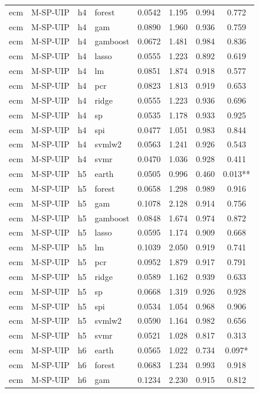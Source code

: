 \begin{ThreePartTable}
\begin{longtable}[t]{llclcccc}
ecm & M-SP-UIP & h4 & forest & 0.0542 & 1.195 & 0.994 & 0.772\\
ecm & M-SP-UIP & h4 & gam & 0.0890 & 1.960 & 0.936 & 0.759\\
ecm & M-SP-UIP & h4 & gamboost & 0.0672 & 1.481 & 0.984 & 0.836\\
ecm & M-SP-UIP & h4 & lasso & 0.0555 & 1.223 & 0.892 & 0.619\\
ecm & M-SP-UIP & h4 & lm & 0.0851 & 1.874 & 0.918 & 0.577\\
ecm & M-SP-UIP & h4 & pcr & 0.0823 & 1.813 & 0.919 & 0.653\\
ecm & M-SP-UIP & h4 & ridge & 0.0555 & 1.223 & 0.936 & 0.696\\
ecm & M-SP-UIP & h4 & sp & 0.0535 & 1.178 & 0.933 & 0.925\\
ecm & M-SP-UIP & h4 & spi & 0.0477 & 1.051 & 0.983 & 0.844\\
ecm & M-SP-UIP & h4 & svmlw2 & 0.0563 & 1.241 & 0.926 & 0.543\\
ecm & M-SP-UIP & h4 & svmr & 0.0470 & 1.036 & 0.928 & 0.411\\
\addlinespace
ecm & M-SP-UIP & h5 & earth & 0.0505 & 0.996 & 0.460 & 0.013**\\
ecm & M-SP-UIP & h5 & forest & 0.0658 & 1.298 & 0.989 & 0.916\\
ecm & M-SP-UIP & h5 & gam & 0.1078 & 2.128 & 0.914 & 0.756\\
ecm & M-SP-UIP & h5 & gamboost & 0.0848 & 1.674 & 0.974 & 0.872\\
ecm & M-SP-UIP & h5 & lasso & 0.0595 & 1.174 & 0.909 & 0.668\\
ecm & M-SP-UIP & h5 & lm & 0.1039 & 2.050 & 0.919 & 0.741\\
ecm & M-SP-UIP & h5 & pcr & 0.0952 & 1.879 & 0.917 & 0.791\\
ecm & M-SP-UIP & h5 & ridge & 0.0589 & 1.162 & 0.939 & 0.633\\
ecm & M-SP-UIP & h5 & sp & 0.0668 & 1.319 & 0.926 & 0.928\\
ecm & M-SP-UIP & h5 & spi & 0.0534 & 1.054 & 0.968 & 0.906\\
ecm & M-SP-UIP & h5 & svmlw2 & 0.0590 & 1.164 & 0.982 & 0.656\\
ecm & M-SP-UIP & h5 & svmr & 0.0521 & 1.028 & 0.817 & 0.313\\
\addlinespace
ecm & M-SP-UIP & h6 & earth & 0.0565 & 1.022 & 0.734 & 0.097*\\
ecm & M-SP-UIP & h6 & forest & 0.0683 & 1.234 & 0.993 & 0.918\\
ecm & M-SP-UIP & h6 & gam & 0.1234 & 2.230 & 0.915 & 0.812\\

\end{longtable}
\end{ThreePartTable}
